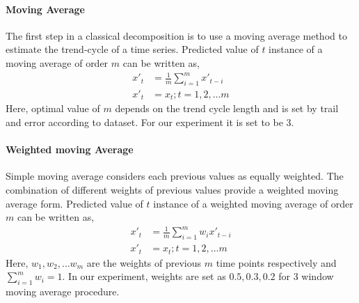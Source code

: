 \paragraph*{\textbf{Moving Average}}
The first step in a classical decomposition is to use a moving average method to estimate the trend-cycle of a time series. Predicted value of $t$ instance of a moving average of order $m$ can be written as,
\begin{align*}
    x'_t &= \frac{1}{m}\sum_{i=1}^{m}x'_{t-i} \\
    x'_t &= x_t ; t=1,2,\dots m
\end{align*}
Here, optimal value of $m$ depends on the trend cycle length and is set by trail and error according to dataset. For our experiment it is set to be $3$.

\paragraph*{\textbf{Weighted moving Average}}
Simple moving average considers each previous values as equally weighted. The combination of different weights of previous values provide a weighted moving average form. Predicted value of $t$ instance of a weighted moving average of order $m$ can be written as,
\begin{align*}
    x'_t &= \frac{1}{m}\sum_{i=1}^{m}w_ix'_{t-i} \\
    x'_t &= x_t ; t=1,2,\dots m
\end{align*}
Here, $w_1, w_2, \dots w_m$ are the weights of previous $m$ time points respectively and $\sum_{i=1}^{m}w_i=1$. In our experiment, weights are set as $0.5, 0.3, 0.2$ for 3  window moving average procedure.
